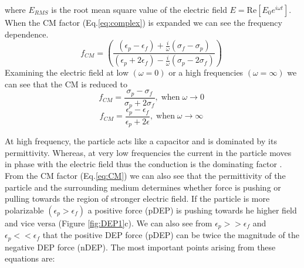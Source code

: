 \documentclass[final]{jyflluk}
\begin{document}
%
where $E_{RMS}$ is the root mean square value of the electric field $E=\mathrm{Re}[E_0 e^{i \omega t}]$. When the CM factor (Eq.\ref{eq:complex}) is expanded we can see the frequency dependence.
%
\begin{equation}
   \label{eq:CM_open}
   f_{CM} = \left(\frac{(\epsilon_{p} - \epsilon_{f}) + \frac{i}{\omega} (\sigma_f - \sigma_p)}
   {(\epsilon_{p} + 2\epsilon_{f}) - \frac{i}{\omega} (\sigma_p - 2\sigma_f)} \right)\;
\end{equation}
%
Examining the electric field at low  $(\omega = 0)$ or a high frequencies $(\omega = \infty)$ we can see that the CM is reduced to 
\begin{equation}
   \label{eq:wat0}
   f_{CM} = \frac{\sigma_p - \sigma_f} {\sigma_p + 2\sigma_f}, \; \mathrm{when } \;\omega \rightarrow 0 \;
\end{equation}
\begin{equation}
   \label{eq:watinf}
   f_{CM} = \frac{\epsilon_p - \epsilon_f} {\epsilon_p + 2\epsilon}, \;\mathrm{when } \;\omega \rightarrow \infty\;
\end{equation}





At high frequency, the particle acts like a capacitor and is dominated by its permittivity. Whereas, at very low frequencies the current in the particle moves in phase with the electric field thus the conduction is the dominating factor \cite{cetin_dielectrophoresis_2011, li_review_2014, pethig_review_2010}. 
From the CM factor (Eq.\ref{eq:CM}) we can also see that the permittivity of the particle and the surrounding medium determines whether force is pushing or pulling towards the region of stronger electric field. If the particle is more polarizable $(\epsilon_p>\epsilon_f)$ a positive force (pDEP) is pushing towards he higher field and vice versa (Figure \ref{fig:DEP1}c). We can also see from $\epsilon_p>>\epsilon_f$ and  $\epsilon_p<<\epsilon_f $ that the positive DEP force (pDEP) can be twice the magnitude of the negative DEP force (nDEP).
The most important points arising from these equations are:
\end{document}
